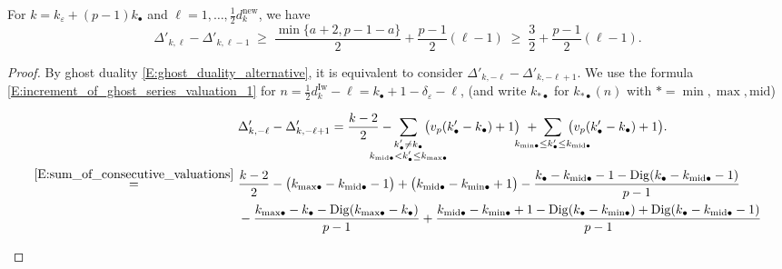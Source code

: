 \begin{lemma}
    \label{L:estimate_Delta_kell}
    For $k =k_\varepsilon + (p-1)k_{\bullet}$ and $\ell = 1,\dots, \frac 12 d_{k}^{\mathrm{new}}$, we have
    $$
    \Delta'_{k, \ell} - \Delta'_{k, \ell-1}\;\geq\; \frac {\min\{a+2, p-1-a\}}2+ \frac {p-1}2 (\ell-1) \;\geq\;  \frac 32 + \frac {p-1}2(\ell-1).
    $$
\end{lemma}

\begin{proof}
    By ghost duality \eqref{E:ghost_duality_alternative}, it is equivalent to consider $\Delta'_{k,-\ell} -\Delta'_{k, -\ell+1} $.
    We use the formula \eqref{E:increment_of_ghost_series_valuation_1} for $n = \frac 12 d_{k}^{\mathrm{Iw}}- \ell = k_{\bullet}+1-\delta_\varepsilon -\ell$, (and write $k_{*\bullet}$ for $k_{* \bullet}(n)$ with $* = \min, \max, {\mathrm{mid}}$)
    \begin{small}
    \begin{align}
    \nonumber
    &\Delta'_{k,-\ell} - \Delta'_{k,-\ell+1}  =
    \frac{k-2}2-  \hspace{-20pt}
    \sum_{\substack{k'_\bullet \neq k_\bullet \\
    k_{{\mathrm{mid}}\bullet} < k'_\bullet  \leq k_{{\max}\bullet}}}
    \hspace{-20pt}\big( v_p(k'_\bullet - k_{\bullet})+1 \big)\ +  \hspace{-20pt} \sum_{
    k_{{\min}\bullet} \leq k'_\bullet \leq k _{{{\mathrm{mid}}}\bullet}}
    \hspace{-20pt}\big( v_p(k'_\bullet - k_{\bullet})+1 \big).
    \\
    \nonumber
    \stackrel{\eqref{E:sum_of_consecutive_valuations}}=\ & \frac{k-2}2 - \big( k_{{\max}\bullet}-k_{{\mathrm{mid}}\bullet }-1\big) + \big( k_{{\mathrm{mid}}\bullet} -k_{{\min}\bullet} +1 \big)-\frac{k_\bullet-k_{{{\mathrm{mid}}}\bullet}-1- {\operatorname{Dig}}(k_\bullet-k_{{{\mathrm{mid}}}\bullet}-1)}{p-1}
    \\
    \nonumber
    &- \frac{k_{{\max}\bullet}-k_\bullet - {\operatorname{Dig}}(k_{{\max}\bullet}-k_\bullet)}{p-1}+\frac{k_{{{\mathrm{mid}}}\bullet} - k_{{\min}\bullet} +1-{\operatorname{Dig}}(k_\bullet - k_{{\min}\bullet})+ {\operatorname{Dig}}(k_\bullet-k_{{{\mathrm{mid}}}\bullet}-1)}{p-1}
    \\
    \label{E:Delta_prime-Delta_prime}

\end{align}
\end{small}
\end{proof}
